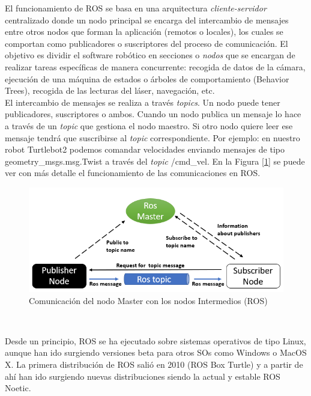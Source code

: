 El funcionamiento de ROS se basa en una arquitectura \textit{cliente-servidor} centralizado donde un nodo principal se encarga del intercambio de mensajes entre otros nodos que forman la aplicación (remotos o locales), los cuales se comportan como publicadores o suscriptores del proceso de comunicación. El objetivo es dividir el software robótico en secciones o \textit{nodos} que se encargan de realizar tareas específicas de manera concurrente: recogida de datos de la cámara, ejecución de una máquina de estados o árboles de comportamiento (Behavior Trees), recogida de las lecturas del láser, navegación, etc.\\

El intercambio de mensajes se realiza a través \textit{topics}. Un nodo puede tener publicadores, suscriptores o ambos. Cuando un nodo publica un mensaje lo hace a través de un \textit{topic} que gestiona el nodo maestro. Si otro nodo quiere leer ese mensaje tendrá que suscribirse al \textit{topic} correspondiente. Por ejemplo: en nuestro robot Turtlebot2 podemos comandar velocidades enviando mensajes de tipo geometry\_msgs.msg.Twist a través del \textit{topic} /cmd\_vel. En la Figura [\ref{fig:ros_master_comunicacion}] se puede ver con más detalle el funcionamiento de las comunicaciones en ROS.\\

\begin{figure} [H]
  \begin{center}
    \includegraphics[width=15cm]{imagenes/cap3/ros_master_communication.png}
  \end{center}
  \caption{Comunicación del nodo Master con los nodos Intermedios (ROS)}
  \label{fig:ros_master_comunicacion}
\end{figure}\

Desde un principio, ROS se ha ejecutado sobre sistemas operativos de tipo Linux, aunque han ido surgiendo versiones beta para otros SOs como Windows o MacOS X. La primera distribución de ROS salió en 2010 (ROS Box Turtle) y a partir de ahí han ido surgiendo nuevas distribuciones siendo la actual y estable ROS Noetic.\\

